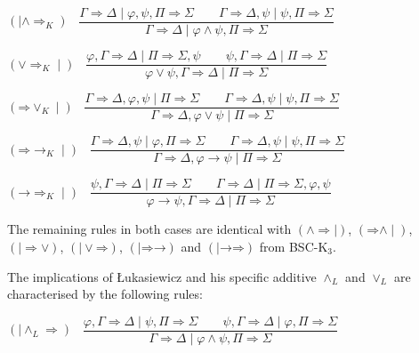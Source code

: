 \documentclass[10pt,a4paper]{article}
\theoremstyle{definition}
\newcommand{\3}{\vspace{.3in}}
\newcommand{\2}{\vspace{.2in}}
\newcommand{\1}{\vspace{.1in}}
\newcommand{\5}{\vspace{.05in}}
\begin{document}
\1

\noindent$(\mid \mathord{\wedge}\mathord{\Rightarrow_K})$ \ $\dfrac{\Gamma\Rightarrow \Delta \mid \varphi, \psi, \Pi\Rightarrow\Sigma \qquad \Gamma\Rightarrow\Delta, \psi \mid \psi, \Pi\Rightarrow\Sigma}{\Gamma\Rightarrow\Delta \mid \varphi\wedge\psi, \Pi\Rightarrow\Sigma}$ 

\1

\noindent$(\mathord{\vee}\mathord{\Rightarrow_K}\mid)$ \ $\dfrac{\varphi, \Gamma
	\Rightarrow \Delta \mid \Pi\Rightarrow\Sigma, \psi \qquad \psi, \Gamma\Rightarrow\Delta \mid \Pi\Rightarrow\Sigma}{\varphi\vee\psi, \Gamma\Rightarrow\Delta \mid \Pi\Rightarrow\Sigma}$ 

\1

\noindent$(\mathord{\Rightarrow}\mathord{\vee_K}\mid)$ \ $\dfrac{\Gamma\Rightarrow \Delta, \varphi, \psi \mid \Pi\Rightarrow\Sigma \qquad \Gamma\Rightarrow\Delta, \psi \mid \psi, \Pi\Rightarrow\Sigma}{\Gamma\Rightarrow\Delta, \varphi\vee\psi \mid \Pi\Rightarrow\Sigma}$ 

\1

\noindent$(\mathord{\Rightarrow}\mathord{\rightarrow_K}\mid)$ \ $\dfrac{\Gamma
	\Rightarrow \Delta, \psi \mid \varphi, \Pi\Rightarrow\Sigma \qquad \Gamma\Rightarrow\Delta, \psi \mid \psi, \Pi\Rightarrow\Sigma}{\Gamma\Rightarrow\Delta, \varphi\rightarrow\psi \mid \Pi\Rightarrow\Sigma}$ 

\1

\noindent$(\mathord{\rightarrow}\mathord{\Rightarrow_K}\mid)$ \ $\dfrac{\psi, \Gamma\Rightarrow \Delta \mid \Pi\Rightarrow\Sigma \qquad \Gamma\Rightarrow\Delta \mid \Pi\Rightarrow\Sigma, \varphi, \psi}{\varphi\rightarrow\psi, \Gamma\Rightarrow\Delta \mid \Pi\Rightarrow\Sigma}$ 

\1

The remaining rules in both cases are identical with  $(\mathord{\wedge}\mathord{\Rightarrow\mid})$, $(\mathord{\Rightarrow}\mathord{\wedge\mid})$, $(\mathord{\mid\Rightarrow}\mathord{\vee})$, $(\mathord{\mid\vee}\mathord{\Rightarrow})$, $(\mid\mathord{\Rightarrow}\mathord{\rightarrow})$ and $(\mid\mathord{\rightarrow}\mathord{\Rightarrow})$ from BSC-K$_3$.

\1

The implications of \L ukasiewicz \cite{Lukasiewicz} and his specific additive $\wedge_L$ and $\vee_L$ are characterised by the following rules:

\begin{flushleft}
	$(\mid\mathord{\wedge_L\Rightarrow})$ \ $\dfrac{\varphi, \Gamma
		\Rightarrow \Delta \mid \psi, \Pi\Rightarrow\Sigma \qquad \psi, \Gamma\Rightarrow\Delta \mid \varphi, \Pi\Rightarrow\Sigma}{ \Gamma\Rightarrow\Delta \mid \varphi\wedge\psi,\Pi\Rightarrow\Sigma}$
\end{flushleft} 
\end{document}
